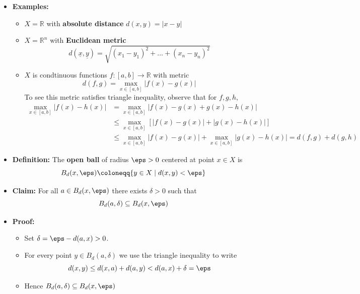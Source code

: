 \documentclass[11pt,twoside]{report}
\newcommand{\bbR}{{\mathbb{R}}}
\newcommand{\vecnot}{\underline}
\begin{document}
\begin{itemize}
\begin{itemize}
\item The elements of $X$ are called \textbf{points} 
\item $d(x,y)$ is called the \textbf{distance} %

\end{itemize}
\item \textbf{Examples:}

\begin{itemize}
\item  $X = \bbR$ with \textbf{absolute distance} $d(x,y)  = |x-y|$

\item   $X = \bbR^n$ with \textbf{Euclidean metric}  
\[
d(\vecnot{x},\vecnot{y})=\sqrt{(x_1-y_1)^2 + \ldots + (x_n-y_n)^2}
\]

\item $X$ is condtinuous functions $f \colon [a,b] \to \bbR$ with metric
\[
d(f,g) = \max_{x \in [a,b] } |f(x) -g(x)|
\]
To see this metric satisfies triangle inequality, observe that for $f, g, h$, 
  \begin{align*}
    \max_{x\in [a,b]} | f(x) - h(x) |
    &= \max_{x\in [a,b]} | f(x) - g(x) + g(x) - h(x) |  \\
    &\leq \max_{x\in [a,b]} \left[ |f(x) - g(x)| + |g(x) - h(x)| \right] \\
    &\leq \max_{x\in [a,b]} |f(x) - g(x)| + \max_{x\in [a,b]} |g(x) - h(x)| = d(f,g) + d(g,h)
  \end{align*}

\end{itemize}



\item \textbf{Definition:}  The \textbf{open ball} of radius $\eps > 0$ centered at point $x \in X$ is 
\[
B_d(x,\eps) \coloneqq \{ y \in X \mid d(x,y)  < \eps\} 
\]

\item \textbf{Claim:} For all $a \in B_d(x,\eps)$ there exists $\delta > 0$ such that 
\[
B_d(a,\delta) \subseteq B_d(x,\eps) 
\]
 \item \textbf{Proof:}
 \begin{itemize}
 
 \item Set $\delta = \eps -  d(a,x) > 0$. 
 
 \item For every point $y \in B_d(a, \delta )$ we use the triangle inequality to write 
 \[
 d(x,y) \le d(x,a)  + d(a, y) <d(a,x) + \delta  = \eps 
 \]
 \item Hence  $B_d(a,\delta) \subseteq B_d(x,\eps)$
 \end{itemize} 

\end{itemize}
\end{document}
